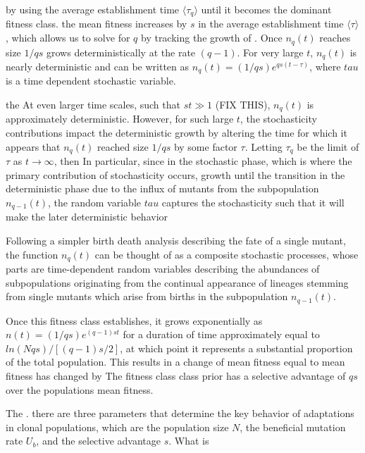 \documentclass[12pt]{article}
\begin{document}
by using the average establishment time $\langle \tau_q \rangle$ until it becomes the dominant fitness class.   the mean fitness increases by $s$ in the average establishment time $\langle \tau \rangle$, which allows us to solve for $q$ by tracking the growth of .  Once $n_q(t)$ reaches size $1/qs$ grows deterministically at the rate $(q-1)$.  For very large $t$, $n_q(t)$ is nearly deterministic and can be written as $n_q(t)= (1/qs)e^{qs(t-\tau)}$, where $tau$ is a time dependent stochastic variable.   

the At even larger time scales, such that $st\gg 1$ (FIX THIS), $n_q(t)$ is approximately deterministic.  However, for such large $t$, the stochasticity contributions impact the deterministic growth by altering the time for which it appears that $n_q(t)$ reached size $1/qs$ by some factor $\tau$.  Letting $\tau_q$ be the limit of $\tau$ as $t \rightarrow \infty$, then  In particular, since in the stochastic phase, which is where the primary contribution of stochasticity occurs, growth until the transition in the deterministic phase due to the influx of mutants from the subpopulation $n_{q-1}(t)$, the random variable $tau$ captures the stochasticity such that it will make the later deterministic behavior

Following a simpler birth death analysis describing the fate of a single mutant, the function $n_q(t)$ can be thought of as a composite stochastic processes, whose parts are time-dependent random variables describing the abundances of subpopulations originating from the continual appearance of lineages stemming from single mutants which arise from births in the subpopulation $n_{q-1}(t)$.  

Once this fitness class establishes, it grows exponentially as $n(t)=(1/qs)e^{(q-1)st}$ for a duration of time approximately equal to $ln(Nqs)/[(q-1)s/2]$, at which point it represents a substantial proportion of the total population.  This results in a change of mean fitness equal to  mean fitness has changed by  The fitness class class prior has a selective advantage of $qs$ over the populations mean fitness.

The . there are three parameters that determine the key behavior of adaptations in clonal populations, which are the population size $N$, the beneficial mutation rate $U_b$, and the selective advantage $s$.  What is  
\end{document}
